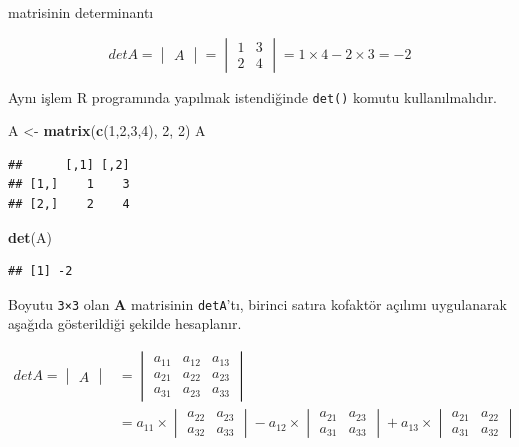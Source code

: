 \documentclass[
]{book}
\newenvironment{Shaded}{\begin{snugshade}}{\end{snugshade}}
\newcommand{\DecValTok}[1]{\textcolor[rgb]{0.00,0.00,0.81}{#1}}
\newcommand{\FunctionTok}[1]{\textcolor[rgb]{0.13,0.29,0.53}{\textbf{#1}}}
\newcommand{\NormalTok}[1]{#1}
\newcommand{\OtherTok}[1]{\textcolor[rgb]{0.56,0.35,0.01}{#1}}
\begin{document}
matrisinin determinantı

\[detA=
\begin{vmatrix}
 A
\end{vmatrix}
=   
\begin{vmatrix}
 1 & 3 \\
 2 & 4 
\end{vmatrix}
=
 1×4-2×3
=
 -2\]

Aynı işlem R programında yapılmak istendiğinde \texttt{det()} komutu kullanılmalıdır.

\begin{Shaded}
\begin{Highlighting}[]
\NormalTok{ A }\OtherTok{\textless{}{-}} \FunctionTok{matrix}\NormalTok{(}\FunctionTok{c}\NormalTok{(}\DecValTok{1}\NormalTok{,}\DecValTok{2}\NormalTok{,}\DecValTok{3}\NormalTok{,}\DecValTok{4}\NormalTok{), }\DecValTok{2}\NormalTok{, }\DecValTok{2}\NormalTok{) }
\NormalTok{ A }
\end{Highlighting}
\end{Shaded}

\begin{verbatim}
##      [,1] [,2]
## [1,]    1    3
## [2,]    2    4
\end{verbatim}

\begin{Shaded}
\begin{Highlighting}[]
 \FunctionTok{det}\NormalTok{(A)}
\end{Highlighting}
\end{Shaded}

\begin{verbatim}
## [1] -2
\end{verbatim}

Boyutu \texttt{3×3} olan \textbf{A} matrisinin \texttt{detA}'tı, birinci satıra kofaktör açılımı uygulanarak aşağıda gösterildiği şekilde hesaplanır.

\[\begin{aligned}
detA=
\begin{vmatrix}
  A
\end{vmatrix}
&=
\begin{vmatrix}
 a_{11} & a_{12} & a_{13} \\
 a_{21} & a_{22} & a_{23} \\
 a_{31} & a_{23} & a_{33}
\end{vmatrix} \\
&=
a_{11}× 
\begin{vmatrix}
 a_{22} & a_{23} \\
 a_{32} & a_{33} 
\end{vmatrix}
 -
a_{12}× 
\begin{vmatrix}
 a_{21} & a_{23} \\
 a_{31} & a_{33} 
\end{vmatrix}
 +
a_{13}× 
 \begin{vmatrix}
 a_{21} & a_{22} \\
 a_{31} & a_{32} 
\end{vmatrix}
\end{aligned}\]
\end{document}
